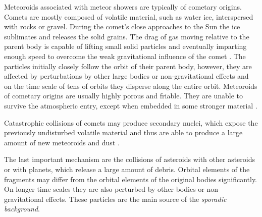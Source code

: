             Meteoroids associated with meteor showers are typically of cometary origins.
            Comets are mostly composed of volatile material, such as water ice, interspersed
            with rocks or gravel. During the comet's close approaches to the Sun the ice sublimates
            and releases the solid grains. The drag of gas moving relative to the parent body
            is capable of lifting small solid particles and eventually imparting enough speed
            to overcome the weak gravitational influence of the comet \citep{whipple1951}.
            The particles initially closely follow the orbit of their parent body,
            however, they are affected by perturbations by other large bodies or non-gravitational effects
            and on the time scale of tens of orbits they disperse along the entire orbit.
            Meteoroids of cometary origins are usually highly porous and friable.
            They are unable to survive the atmospheric entry, except when embedded in some stronger material \citep{nittler+2019}.

            Catastrophic collisions of comets may produce secondary nuclei, which expose
            the previously undisturbed volatile material and thus are able to produce
            a large amount of new meteoroids and dust \citep{jenniskens2006}.

            The last important mechanism are the collisions of asteroids with other asteroids
            or with planets, which release a large amount of debris. Orbital elements of the fragments
            may differ from the orbital elements of the original bodies significantly.
            On longer time scales they are also perturbed by other bodies or non-gravitational effects.
            These particles are the main source of the \emph{sporadic background}.

